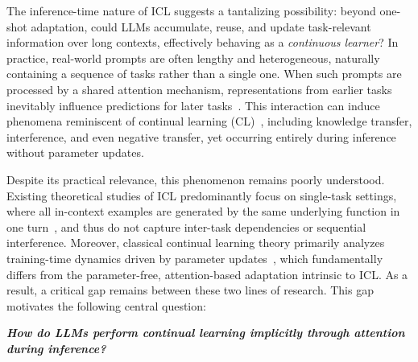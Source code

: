 \documentclass{article}
\theoremstyle{plain}
\theoremstyle{definition}
\theoremstyle{remark}
\begin{document}
The inference-time nature of ICL suggests a tantalizing possibility: beyond one-shot adaptation, could LLMs accumulate, reuse, and update task-relevant information over long contexts, effectively behaving as a \emph{continuous learner}? In practice, real-world prompts are often lengthy and heterogeneous, naturally containing a sequence of tasks rather than a single one. When such prompts are processed by a shared attention mechanism, representations from earlier tasks inevitably influence predictions for later tasks~\citep{kang2025incontextlearningperformcontinual,momeni-etal-2025-context}. This interaction can induce phenomena reminiscent of continual learning (CL)~\citep{shi2025survey,zheng2025survey}, including knowledge transfer, interference, and even negative transfer, yet occurring entirely during inference without parameter updates.

Despite its practical relevance, this phenomenon remains poorly understood. Existing theoretical studies of ICL predominantly focus on single-task settings, where all in-context examples are generated by the same underlying function in one turn~\citep{bai2023transformers,ahn2023transformers,pmlr-v202-von-oswald23a,zhang_context_2024}, and thus do not capture inter-task dependencies or sequential interference. Moreover, classical continual learning theory primarily analyzes training-time dynamics driven by parameter updates~\citep{pmlr-v202-lin23f,pmlr-v178-evron22a,pmlr-v235-ding24c,li2025towards}, which fundamentally differs from the parameter-free, attention-based adaptation intrinsic to ICL. As a result, a critical gap remains between these two lines of research. This gap motivates the following central question:
\begin{tcolorbox}[boxrule=0.2pt, boxsep=0pt]
\centering
\textbf{\textit{How do LLMs perform continual learning implicitly through attention during inference?}}
\end{tcolorbox} 
\end{document}
